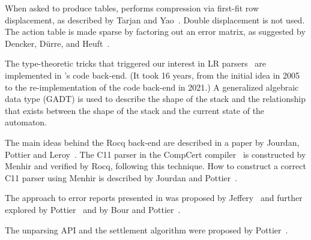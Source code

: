 \documentclass[onecolumn,11pt,nocopyrightspace,preprint]{sigplanconf}
\begin{document}
When asked to produce tables, \menhir performs compression via first-fit
row displacement, as described by Tarjan and Yao~\cite{tarjan-yao-79}.
Double displacement is not used. The action table is made sparse by
factoring out an error matrix, as suggested by Dencker, Dürre, and
Heuft~\cite{dencker-84}.

The type-theoretic tricks that triggered our interest in LR
parsers~\cite{pottier-regis-gianas-typed-lr} are implemented
in \menhir's code back-end. (It took 16 years, from the initial
idea in 2005 to the re-implementation of the code back-end in 2021.)
A generalized algebraic data type (GADT) is used to describe the
shape of the stack and the relationship that exists between the
shape of the stack and the current state of the automaton.

The main ideas behind the Rocq back-end are described in a paper by Jourdan,
Pottier and Leroy~\cite{jourdan-leroy-pottier-12}. The C11 parser in the
CompCert compiler~\cite{compcert} is constructed by Menhir and verified by
Rocq, following this technique. How to construct a correct C11 parser using
Menhir is described by Jourdan and Pottier~\cite{jourdan-pottier-17}.

The approach to error reports presented in  was
proposed by Jeffery~\cite{jeffery-03} and further explored by
Pottier~\cite{pottier-reachability-cc-2016} and by
Bour and Pottier~\cite{bour-pottier-21}.

The unparsing API and the settlement algorithm were proposed
by Pottier~\cite{pottier-unparsing-24}.





\end{document}
